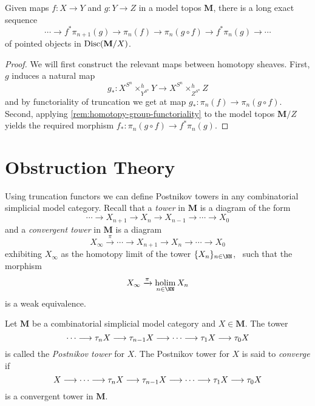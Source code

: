 \begin{proposition}
  Given maps \(f\colon X\to Y\) and \(g\colon Y\to Z\) in a model
  topos \(\mathbf M\), there is a long exact sequence
  \[
  \cdots \to f^{*}\pi_{n+1}(g) \to \pi_{n}(f) \to \pi_{n}(g\circ f) \to f^{*}\pi_{n}(g) \to \cdots
  \]
  of pointed objects in \(\operatorname{\textnormal{Disc}}(\mathbf M/X)\).
\end{proposition}
\begin{proof}
  We will first construct the relevant maps between homotopy
  sheaves. First, \(g\) induces a natural map
  \[
  g_{*}\colon X^{S^{n}}\times^{h}_{Y^{S^{n}}} Y\to
  X^{S^{n}}\times^{h}_{Z^{S^{n}}} Z
  \]
  and by functoriality of truncation we get at map \(g_{*}\colon
  \pi_{n}(f)\to\pi_{n}(g\circ f)\). Second, applying
  \autoref{rem:homotopy-group-functoriality} to the model topos
  \(\mathbf M/Z\) yields the required morphism \(f_{*}\colon
  \pi_{n}(g\circ f)\to f^{*}\pi_{n}(g)\).
\end{proof}


\section{Obstruction Theory}

Using truncation functors we can define Postnikov towers in any
combinatorial simplicial model category. Recall that a \emph{tower} in
\(\mathbf M\) is a diagram of the form
\[
\cdots \to X_{n+1}\to X_{n}\to X_{n-1}\to \cdots \to X_{0}
\]
and a \emph{convergent tower} in \(\mathbf M\) is a diagram
\[
X_{\infty}\xrightarrow{\pi} \cdots \to X_{n+1}\to X_{n}\to\cdots\to
X_{0}
\]
exhibiting \(X_{\infty}\) as the homotopy limit of the tower
\(\{X_{n}\}_{n\in\NN}\), \ie~such that the morphism
\[
X_{\infty}\xrightarrow{\pi}\holim_{n\in\NN} X_{n}
\]
is a weak equivalence.

\begin{definition}
  Let \(\mathbf M\) be a combinatorial simplicial model category and
  \(X\in\mathbf M\). The tower
  \[
  \cdots\longrightarrow\tau_{n} X\longrightarrow\tau_{n-1} X\longrightarrow\cdots\longrightarrow\tau_{1}
  X\longrightarrow\tau_{0}X
  \]
  is called the \emph{Postnikov tower} for \(X\). The Postnikov tower
  for \(X\) is said to \emph{converge} if
  \[
  X\longrightarrow\cdots\longrightarrow\tau_{n} X\longrightarrow\tau_{n-1} X\longrightarrow\cdots\longrightarrow\tau_{1}
  X\longrightarrow\tau_{0}X
  \]
  is a convergent tower in \(\mathbf M\).
\end{definition}

\printbibliography

\listoftodos

